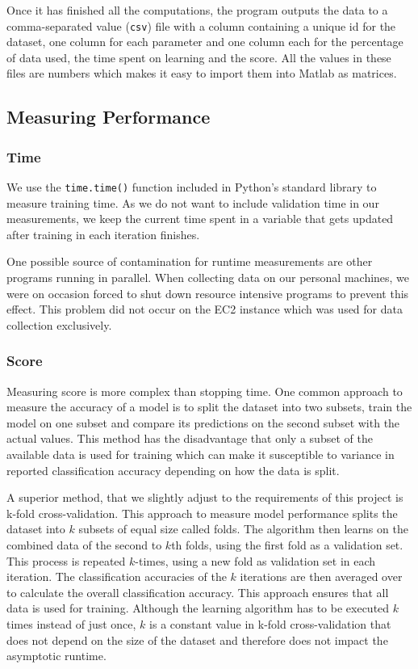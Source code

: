 \documentclass[a4paper,12pt,twoside,openright]{report}
\begin{document}
Once it has finished all the computations, the program outputs the data to a comma-separated value (\texttt{csv}) file with a column containing a unique id for the dataset, one column for each parameter and one column each for the percentage of data used, the time spent on learning and the score. All the values in these files are numbers which makes it easy to import them into Matlab as matrices. 



\subsection{Measuring Performance}

\subsubsection{Time}
We use the \texttt{time.time()} function included in Python's standard library to measure training time. As we do not want to include validation time in our measurements, we keep the current time spent in a variable that gets updated after training in each iteration finishes.

One possible source of contamination for runtime measurements are other programs running in parallel. When collecting data on our personal machines, we were on occasion forced to shut down resource intensive programs to prevent this effect. This problem did not occur on the EC2 instance which was used for data collection exclusively.

\subsubsection{Score}

Measuring score is more complex than stopping time. One common approach to measure the accuracy of a model is to split the dataset into two subsets, train the model on one subset and compare its predictions on the second subset with the actual values. This method has the disadvantage that only a subset of the available data is used for training which can make it susceptible to variance in reported classification accuracy depending on how the data is split.

A superior method, that we slightly adjust to the requirements of this project is k-fold cross-validation. This approach to measure model performance splits the dataset into $k$ subsets of equal size called folds. The algorithm then learns on the combined data of the second to $k$th folds, using the first fold as a validation set. This process is repeated $k$-times, using a new fold as validation set in each iteration. The classification accuracies of the $k$ iterations are then averaged over to calculate the overall classification accuracy. This approach ensures that all data is used for training. Although the learning algorithm has to be executed $k$ times instead of just once, $k$ is a constant value in k-fold cross-validation that does not depend on the size of the dataset and therefore does not impact the asymptotic runtime.
\end{document}
